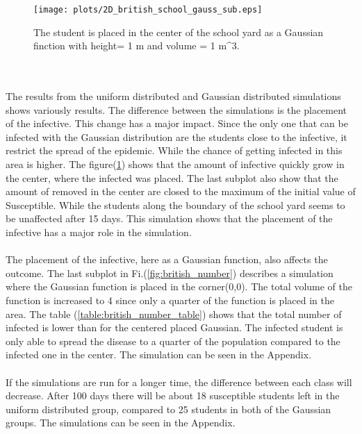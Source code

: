 \documentclass[%
twoside,                 %
final,                   %
10pt]{article}
\begin{document}
\begin{figure}[ht]
  \centerline{\texttt{[image: plots/2D\_british\_school\_gauss\_sub.eps]}}
  \caption{
  \label{fig:gauss_sub} The student is placed in the center of the school yard as a Gaussian finction with height= 1 m and volume = 1 m^3.
  }
\end{figure}


\\
\\
The results from the uniform distributed and Gaussian distributed simulations shows variously results. The difference between the simulations is the placement of the infective. This change has a major impact. Since the only one that can be infected with the Gaussian distribution are the students close to the infective, it restrict the spread of the epidemic. While the chance of getting infected in this area is higher. The figure(\ref{fig:gauss_sub}) shows that the amount of infective quickly grow in the center, where the infected was placed. The last subplot also show that the amount of removed in the center are closed to the maximum of the initial value of Susceptible. While the students along the boundary of the school yard seems to be unaffected after 15 days. This simulation shows that the placement of the infective has a major role in the simulation.
\\
\\
The placement of the infective, here as a Gaussian function, also affects the outcome. The last subplot in Fi.(\ref{fig:british_number}) describes a simulation where the Gaussian function is placed in the corner(0,0). The total volume of the function is increased to 4 since only a quarter of the function is placed in the area. The table (\ref{table:british_number_table}) shows that the total number of infected is lower than for the centered placed Gaussian. The infected student is only able to spread the disease to a quarter of the population compared to the infected one in the center. The simulation can be seen in the Appendix.
\\
\\
If the simulations are run for a longer time, the difference between each class will decrease. After 100 days there will be about 18 susceptible students left in the uniform distributed group, compared to 25 students in both of the Gaussian groups. The simulations can be seen in the Appendix.

\end{document}
